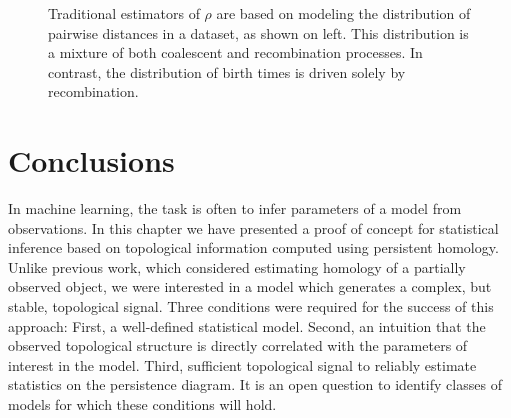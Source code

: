 \begin{figure}
\centering
{}
\caption[Comparing traditional estimators of $\rho$ to ]{Traditional estimators of $\rho$ are based on modeling the distribution of pairwise distances in a dataset, as shown on left. This distribution is a mixture of both coalescent and recombination processes. In contrast, the distribution of birth times is driven solely by recombination.}
\label{fig:estimator_comparison}
\end{figure}

\section{Conclusions}
\label{parametric_inference:sec:discussion}

In machine learning, the task is often to infer parameters of a model from observations.
In this chapter we have presented a proof of concept for statistical inference based on topological information computed using persistent homology.
Unlike previous work, which considered estimating homology of a partially observed object, we were interested in a model which generates a complex, but stable, topological signal.
Three conditions were required for the success of this approach:
First, a well-defined statistical model.
Second, an intuition that the observed topological structure is directly correlated with the parameters of interest in the model.
Third, sufficient topological signal to reliably estimate statistics on the persistence diagram.
It is an open question to identify classes of models for which these conditions will hold.
